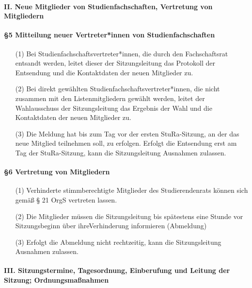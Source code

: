     \paragraph{II. Neue Mitglieder von Studienfachschaften, Vertretung von Mitgliedern}
        \paragraph{§5 Mitteilung neuer Vertreter*innen von Studienfachschaften}
            \begin{itemize}
                \item[(1)] Bei Studienfachschaftsvertreter*innen, die durch den Fachschaftsrat entsandt werden, leitet dieser der Sitzungsleitung das Protokoll der Entsendung und die Kontaktdaten der neuen Mitglieder zu.
                \item[(2)] Bei direkt gewählten Studienfachschaftsvertreter*innen, die nicht zusammen mit den Listenmitgliedern gewählt werden, leitet der Wahlausschuss der Sitzungsleitung das Ergebnis der Wahl und die Kontaktdaten der neuen Mitglieder zu.
                \item[(3)] Die Meldung hat bis zum Tag vor der ersten StuRa-Sitzung, an der das neue Mitglied teilnehmen soll, zu erfolgen. Erfolgt die Entsendung erst am Tag der StuRa-Sitzung, kann die Sitzungsleitung Ausnahmen zulassen.
            \end{itemize}
        \paragraph{§6 Vertretung von Mitgliedern}
            \begin{itemize}
                \item[(1)] Verhinderte stimmberechtigte Mitglieder des Studierendenrats können sich gemäß § 21 OrgS vertreten lassen. 
                \item[(2)] Die Mitglieder müssen die Sitzungsleitung bis spätestens eine Stunde vor Sitzungsbeginn über ihreVerhinderung informieren (Abmeldung)
                \item[(3)] Erfolgt die Abmeldung nicht rechtzeitig, kann die Sitzungsleitung Ausnahmen zulassen.
            \end{itemize}
    \paragraph{III. Sitzungstermine, Tagesordnung, Einberufung und Leitung der Sitzung; Ordnungsmaßnahmen}
